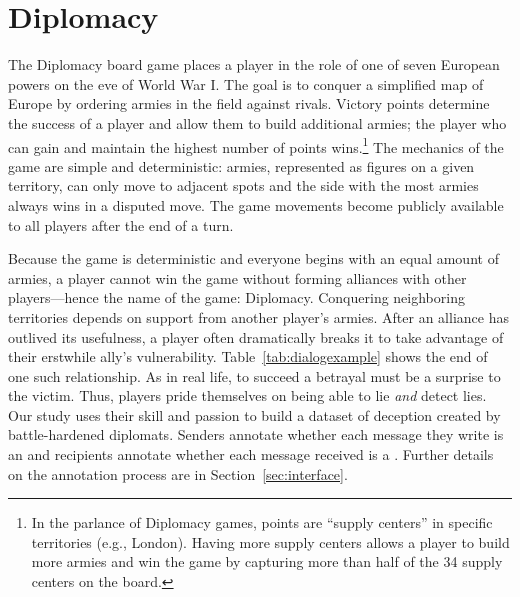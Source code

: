 \section{Diplomacy}
\label{sec:diplo}


The Diplomacy board game places a player in the role of one of seven
European powers on the eve of World War I.
%
The goal is to conquer a simplified map of Europe by ordering armies
in the field against rivals.
%
Victory points determine the success of a player and allow them to build
additional armies; the player who can gain and maintain the highest
number of points wins.\footnote{In the parlance of Diplomacy games,
  points are ``supply centers'' in specific territories (e.g.,
  London).  Having more supply centers allows a player to build more
  armies and win the game by capturing more than half of the 34 supply
  centers on the board.}
%
The mechanics of the game are simple and deterministic: armies,
represented as figures on a given territory, can only move to adjacent
spots and the side with the most armies always wins in a disputed
move.
%
The game movements become publicly available to all players after the
end of a turn. 
%

Because the game is deterministic and 
everyone begins with an equal amount of armies, a player cannot win
the game without forming alliances with other players---hence the name
of the game: Diplomacy. 
%
Conquering neighboring territories depends on support from another
player's armies.
%
After an alliance has outlived its usefulness, a player often
dramatically breaks it to take advantage of their erstwhile ally's
vulnerability.
%
Table~\ref{tab:dialogexample} shows the end of one such relationship.
%
As in real life, to succeed a betrayal must be a surprise to the
victim.
%
Thus, players pride themselves on being able to lie \emph{and} detect lies.
%
Our study uses their skill and passion to build a dataset of deception
created by battle-hardened diplomats.
%
Senders annotate whether each message they write is an \alie{} and
recipients annotate whether each message received is a \slie{}.
%
Further details on the annotation process are in
Section~\ref{sec:interface}.
%


